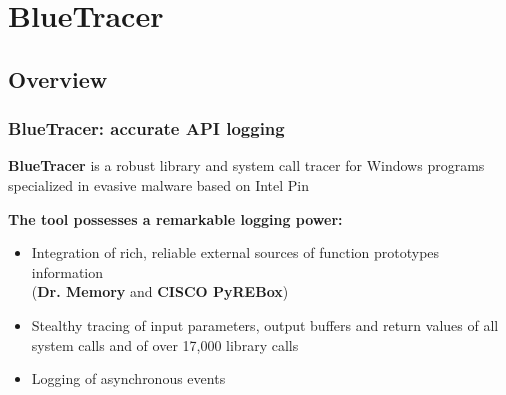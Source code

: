 \documentclass[compress]{beamer}
\begin{document}
\section{BlueTracer}

\subsection{Overview}
\begin{frame}
    \frametitle{BlueTracer: accurate API logging}

\medskip

\begin{beamerboxesrounded}[shadow=true]{}
\textbf{BlueTracer} is a robust library and system call tracer for Windows programs specialized in evasive malware based on Intel Pin
\end{beamerboxesrounded}

\bigskip

\textcolor{sapienza}{\textbf{The tool possesses a remarkable logging power:}}
\begin{itemize}
\item Integration of rich, reliable external sources of function prototypes information  \\ (\textbf{Dr. Memory}
and \textbf{CISCO PyREBox})

\item Stealthy tracing of input parameters, output buffers and return values of all system calls and of over 17,000 library calls
\item Logging of asynchronous events
\end{itemize}    

\end{frame}
\end{document}
